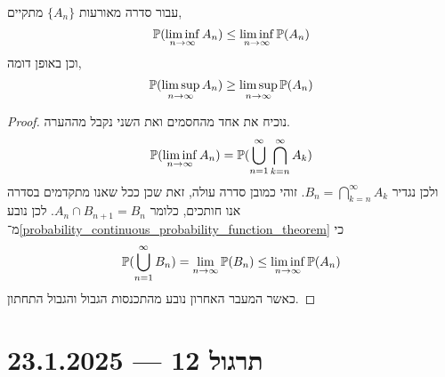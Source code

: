 \begin{lemma}
	עבור סדרה מאורעות $\{ A_n \}$ מתקיים,
	\[
		\mathbb{P}(\liminf_{n \to \infty} A_n)
		\le 
		\liminf_{n \to \infty} \mathbb{P}(A_n)
	\]
	וכן באופן דומה,
	\[
		\mathbb{P}(\limsup_{n \to \infty} A_n)
		\ge 
		\limsup_{n \to \infty} \mathbb{P}(A_n)
	\]
\end{lemma}
\begin{proof}
	נוכיח את אחד מהחסמים ואת השני נקבל מההערה.
	\[
		\mathbb{P}(\liminf_{n \to \infty} A_n)
		= \mathbb{P}( \bigcup_{n = 1}^\infty \bigcap_{k = n}^\infty A_k)
	\]
	ולכן נגדיר $B_n = \bigcap_{k = n}^\infty A_k$.
	זוהי כמובן סדרה עולה, זאת שכן ככל שאנו מתקדמים בסדרה אנו חותכים, כלומר $A_n \cap B_{n + 1} = B_n$.
	לכן נובע מ־\ref{probability_continuous_probability_function_theorem} כי
	\[
		\mathbb{P}(\bigcup_{n = 1}^\infty B_n)
		= \lim_{n \to \infty} \mathbb{P}(B_n)
		\le \liminf_{n \to \infty} \mathbb{P}(A_n)
	\]
	כאשר המעבר האחרון נובע מהתכנסות הגבול והגבול התחתון.
\end{proof}

\section{תרגול 12 --- 23.1.2025}
